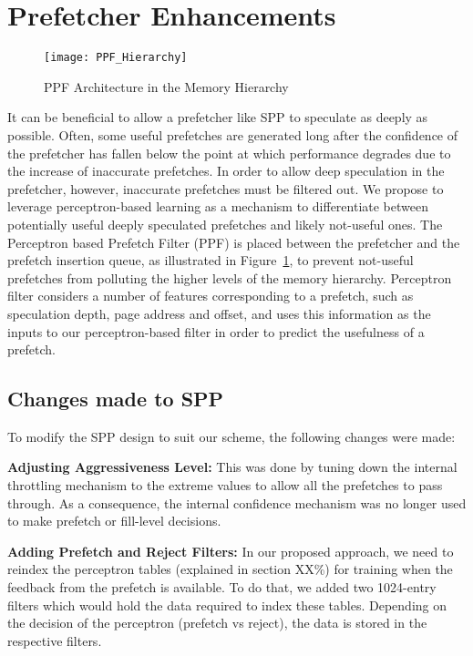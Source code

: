 \section{Prefetcher Enhancements}
\label{Enhancements}

\begin{figure}
  \begin{center}
  \texttt{[image: PPF\_Hierarchy]}
  \caption{PPF Architecture in the Memory Hierarchy}
  \label{fig:PPF_Hierarchy}
  \end{center}
\end{figure}

It can be beneficial to allow a prefetcher like SPP to speculate as 
deeply as possible. Often, some useful prefetches are generated long 
after the confidence of the prefetcher has fallen below the point at 
which performance degrades due to the increase of inaccurate prefetches.  
In order to allow deep speculation in the prefetcher, however, inaccurate
prefetches must be filtered out.  We propose to leverage
perceptron-based learning as a mechanism to differentiate between
potentially useful deeply speculated prefetches and likely not-useful
ones. The Perceptron based Prefetch Filter (PPF) is placed between the
prefetcher and the prefetch insertion queue, as illustrated in
Figure~\ref{fig:PPF_Hierarchy}, to prevent not-useful prefetches from
polluting the higher levels of the memory hierarchy.
Perceptron filter considers a number of features corresponding to a
prefetch, such as speculation depth, page address and offset, and uses
this information as the inputs to our perceptron-based filter in order
to predict the usefulness of a prefetch.  

\subsection{Changes made to SPP}
\label{Enhancements-SPP}
To modify the SPP design to suit our scheme, the following changes
were made:

\noindent \textbf{Adjusting Aggressiveness Level:}
This was done by tuning down the internal throttling mechanism to the 
extreme values to allow all the prefetches to pass through. As a 
consequence, the internal confidence mechanism was no longer used
to make prefetch or fill-level decisions.

\noindent \textbf{Adding Prefetch and Reject Filters:}
In our proposed approach, we need to reindex the perceptron tables (explained in
section XX\%) for training when the feedback from the prefetch is available.
To do that, we added two 1024-entry filters which would hold the data required to index
these tables. Depending on the decision of the perceptron (prefetch vs reject), the
data is stored in the respective filters.

